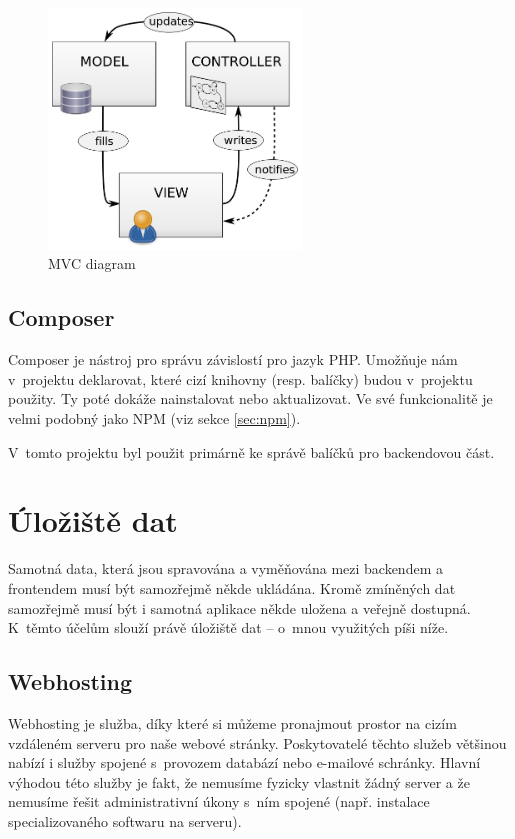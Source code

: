 		\begin{figure}[h]
			\centering
			\includegraphics[width=0.6\textwidth]{img/mvc_diagram.png}
			\caption{MVC diagram \cite{MVCDiagram}}
			\label{fig:mvc_diagram}
		\end{figure}
		
	\subsection{Composer}\label{sec:composer}
	Composer je nástroj pro správu závislostí pro jazyk PHP. Umožňuje nám v~projektu deklarovat, které cizí knihovny (resp. balíčky) budou v~projektu použity. Ty poté dokáže nainstalovat nebo aktualizovat. Ve své funkcionalitě je velmi podobný jako NPM (viz sekce \ref{sec:npm}). \cite{Composer}
	
	V~tomto projektu byl použit primárně ke správě balíčků pro backendovou část.
		
\section{Úložiště dat}
Samotná data, která jsou spravována a vyměňována mezi backendem a frontendem musí být samozřejmě někde ukládána. Kromě zmíněných dat samozřejmě musí být i samotná aplikace někde uložena a veřejně dostupná. K~těmto účelům slouží právě úložiště dat – o~mnou využitých píši níže.

	\subsection{Webhosting}
	Webhosting je služba, díky které si můžeme pronajmout prostor na cizím vzdáleném serveru pro naše webové stránky. Poskytovatelé těchto služeb většinou nabízí i služby spojené s~provozem databází nebo e-mailové schránky. Hlavní výhodou této služby je fakt, že nemusíme fyzicky vlastnit žádný server a že nemusíme řešit administrativní úkony s~ním spojené (např. instalace specializovaného softwaru na serveru). \cite{Webhosting}
	
